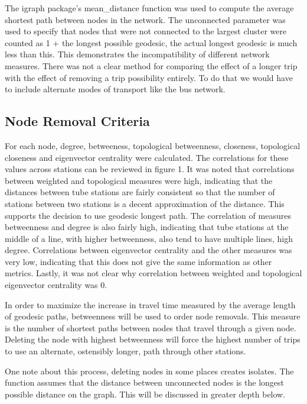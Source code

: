 \documentclass[11pt]{article} %
\begin{document}
The igraph package's mean\_distance\(\) function was used to compute the average shortest path between nodes in the network. The unconnected parameter was used to specify that nodes that were not connected to the largest cluster were counted as 1 + the longest possible geodesic, the actual longest geodesic is much less than this. This demonstrates the incompatibility of different network measures. There was not a clear method for comparing the effect of a longer trip with the effect of removing a trip possibility entirely. To do that we would have to include alternate modes of transport like the bus network. 

\subsection{Node Removal Criteria}

For each node, degree, betweeness, topological betweenness, closeness, topological closeness and eigenvector centrality were calculated. The correlations for these values across stations can be reviewed in figure 1. It was noted that correlations between weighted and topological measures were high, indicating that the distances between tube stations are fairly consistent so that the number of stations between two stations is a decent approximation of the distance. This supports the decision to use geodesic longest path. The correlation of measures betweenness and degree is also fairly high, indicating that tube stations at the middle of a line, with higher betweenness, also tend to have multiple lines, high degree. Correlations between eigenvector centrality and the other measures was very low, indicating that this does not give the same information as other metrics. Lastly, it was not clear why correlation between weighted and topological eigenvector centrality was 0.

In order to maximize the increase in travel time measured by the average length of geodesic paths, betweenness will be used to order node removals. This measure is the number of shortest paths between nodes that travel through a given node. Deleting the node with highest betweenness will force the highest number of trips to use an alternate, ostensibly longer, path through other stations. 

One note about this process, deleting nodes in some places creates isolates. The function assumes that the distance between unconnected nodes is the longest possible distance on the graph. This will be discussed in greater depth below. 
\end{document}
